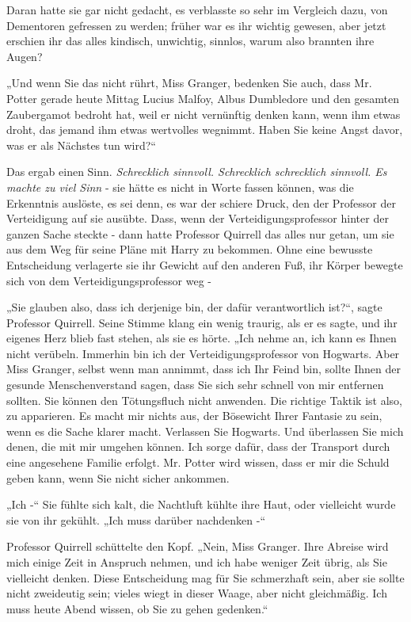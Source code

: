 {Daran hatte sie gar nicht gedacht, es verblasste so sehr im Vergleich dazu, von Dementoren gefressen zu werden; früher war es ihr wichtig gewesen, aber jetzt erschien ihr das alles kindisch, unwichtig, sinnlos, warum also brannten ihre Augen?

„Und wenn Sie das nicht rührt, Miss Granger, bedenken Sie auch, dass Mr. Potter gerade heute Mittag Lucius Malfoy, Albus Dumbledore und den gesamten Zaubergamot bedroht hat, weil er nicht vernünftig denken kann, wenn ihm etwas droht, das jemand ihm etwas wertvolles wegnimmt. Haben Sie keine Angst davor, was er als Nächstes tun wird?“

Das ergab einen Sinn. \emph{Schrecklich sinnvoll. Schrecklich schrecklich sinnvoll. Es machte zu viel Sinn} - sie hätte es nicht in Worte fassen können, was die Erkenntnis auslöste, es sei denn, es war der schiere Druck, den der Professor der Verteidigung auf sie ausübte. Dass, wenn der Verteidigungsprofessor hinter der ganzen Sache steckte - dann hatte Professor Quirrell das alles nur getan, um sie aus dem Weg für seine Pläne mit Harry zu bekommen. Ohne eine bewusste Entscheidung verlagerte sie ihr Gewicht auf den anderen Fuß, ihr Körper bewegte sich von dem Verteidigungsprofessor weg -

„Sie glauben also, dass ich derjenige bin, der dafür verantwortlich ist?“, sagte Professor Quirrell. Seine Stimme klang ein wenig traurig, als er es sagte, und ihr eigenes Herz blieb fast stehen, als sie es hörte. „Ich nehme an, ich kann es Ihnen nicht verübeln. Immerhin bin ich der Verteidigungsprofessor von Hogwarts. Aber Miss Granger, selbst wenn man annimmt, dass ich Ihr Feind bin, sollte Ihnen der gesunde Menschenverstand sagen, dass Sie sich sehr schnell von mir entfernen sollten. Sie können den Tötungsfluch nicht anwenden. Die richtige Taktik ist also, zu apparieren. Es macht mir nichts aus, der Bösewicht Ihrer Fantasie zu sein, wenn es die Sache klarer macht. Verlassen Sie Hogwarts. Und überlassen Sie mich denen, die mit mir umgehen können. Ich sorge dafür, dass der Transport durch eine angesehene Familie erfolgt. Mr. Potter wird wissen, dass er mir die Schuld geben kann, wenn Sie nicht sicher ankommen.

„Ich -“ Sie fühlte sich kalt, die Nachtluft kühlte ihre Haut, oder vielleicht wurde sie von ihr gekühlt. „Ich muss darüber nachdenken -“

Professor Quirrell schüttelte den Kopf. „Nein, Miss Granger. Ihre Abreise wird mich einige Zeit in Anspruch nehmen, und ich habe weniger Zeit übrig, als Sie vielleicht denken. Diese Entscheidung mag für Sie schmerzhaft sein, aber sie sollte nicht zweideutig sein; vieles wiegt in dieser Waage, aber nicht gleichmäßig. Ich muss heute Abend wissen, ob Sie zu gehen gedenken.“

}
